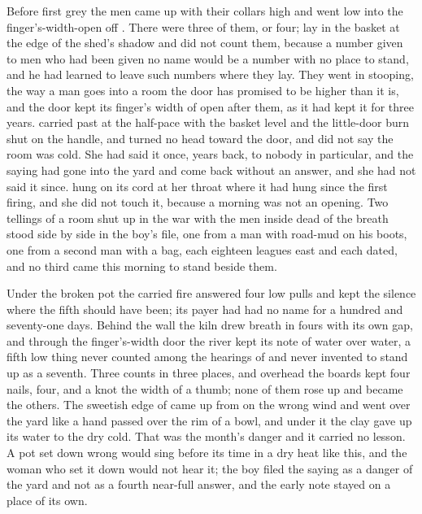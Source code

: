 
Before first grey the men came up  with their collars high and went low into the finger's-width-open  off . There were three of them, or four;  lay in the basket at the edge of the shed's shadow and did not count them, because a number given to men who had been given no name would be a number with no place to stand, and he had learned to leave such numbers where they lay. They went in stooping, the way a man goes into a room the door has promised to be higher than it is, and the door kept its finger's width of open after them, as it had kept it for three years.  carried past at the half-pace with the basket level and the little-door burn shut on the handle, and turned no head toward the door, and did not say the room was cold. She had said it once, years back, to nobody in particular, and the saying had gone into the yard and come back without an answer, and she had not said it since.  hung on its cord at her throat where it had hung since the first firing, and she did not touch it, because a morning was not an opening. Two tellings of a room shut up in the war with the men inside dead of the breath stood side by side in the boy's file, one from a man with road-mud on his boots, one from a second man with a bag, each eighteen leagues east and each dated, and no third came this morning to stand beside them.

Under the broken pot the carried fire answered four low pulls and kept the silence where the fifth should have been; its payer had had no name for a hundred and seventy-one days. Behind the wall the kiln drew breath in fours with its own gap, and through the finger's-width door the river kept its note of water over water, a fifth low thing never counted among the hearings of  and never invented to stand up as a seventh. Three counts in three places, and overhead the boards kept four nails, four, and a knot the width of a thumb; none of them rose up and became the others. The sweetish edge of  came up from  on the wrong wind and went over the yard like a hand passed over the rim of a bowl, and under it the clay gave up its water to the dry cold. That was the month's danger and it carried no lesson. A pot set down wrong would sing before its time in a dry heat like this, and the woman who set it down would not hear it; the boy filed the saying as a danger of the yard and not as a fourth near-full answer, and the early note stayed on a place of its own.

